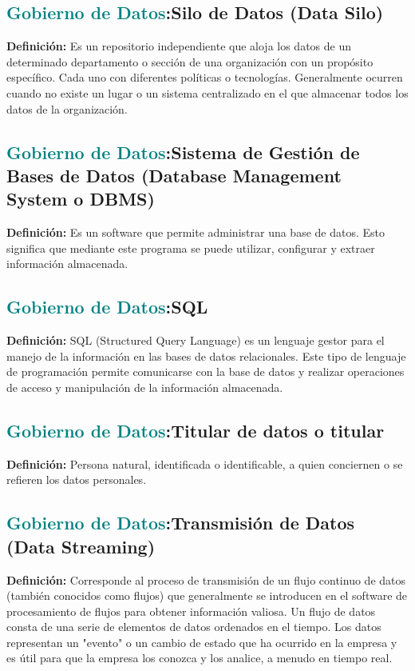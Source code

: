 \documentclass[12pt]{article}
\begin{document}
\subsection{\textcolor{teal}{Gobierno de Datos}:{Silo de Datos (Data Silo)}}
\textbf{Definición:} Es un repositorio independiente que aloja los datos de un determinado departamento o sección de una organización con un propósito específico. Cada uno con diferentes políticas o tecnologías. Generalmente ocurren cuando no existe un lugar o un sistema centralizado en el que almacenar todos los datos de la organización. 
\subsection{\textcolor{teal}{Gobierno de Datos}:{Sistema de Gestión de Bases de Datos (Database Management System o DBMS)}}
\textbf{Definición:} Es un software que permite administrar una base de datos. Esto significa que mediante este programa se puede utilizar, configurar y extraer información almacenada​.
\subsection{\textcolor{teal}{Gobierno de Datos}:{SQL}}
\textbf{Definición:} SQL (Structured Query Language) es un lenguaje gestor para el manejo de la información en las bases de datos relacionales. Este tipo de lenguaje de programación permite comunicarse con la base de datos y realizar operaciones de acceso y manipulación de la información almacenada.
\subsection{\textcolor{teal}{Gobierno de Datos}:{Titular de datos o titular}}
\textbf{Definición:} Persona natural, identificada o identificable, a quien conciernen o se refieren los datos personales. 
\subsection{\textcolor{teal}{Gobierno de Datos}:{Transmisión de Datos (Data Streaming)}}
\textbf{Definición:} Corresponde al proceso de transmisión de un flujo continuo de datos (también conocidos como flujos) que generalmente se introducen en el software de procesamiento de flujos para obtener información valiosa. Un flujo de datos consta de una serie de elementos de datos ordenados en el tiempo. Los datos representan un "evento" o un cambio de estado que ha ocurrido en la empresa y es útil para que la empresa los conozca y los analice, a menudo en tiempo real.
\end{document}
